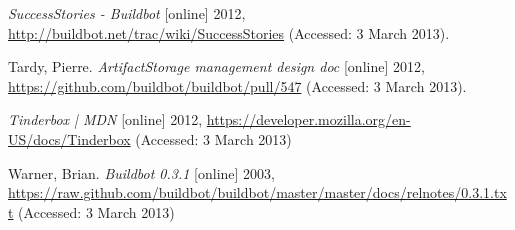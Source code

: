 \documentclass[conference]{IEEEtran}
\begin{document}
\begin{thebibliography}{13}
\textit{SuccessStories - Buildbot} [online] 2012, \url{http://buildbot.net/trac/wiki/SuccessStories} (Accessed: 3 March 2013).

Tardy, Pierre.  \textit{ArtifactStorage management design doc} [online] 2012, \url{https://github.com/buildbot/buildbot/pull/547} (Accessed: 3 March 2013).

\textit{Tinderbox | MDN} [online] 2012, \url{https://developer.mozilla.org/en-US/docs/Tinderbox} (Accessed: 3 March 2013)

Warner, Brian.  \textit{Buildbot 0.3.1} [online] 2003, \url{https://raw.github.com/buildbot/buildbot/master/master/docs/relnotes/0.3.1.txt} (Accessed: 3 March 2013)

\end{thebibliography}
\end{document}
